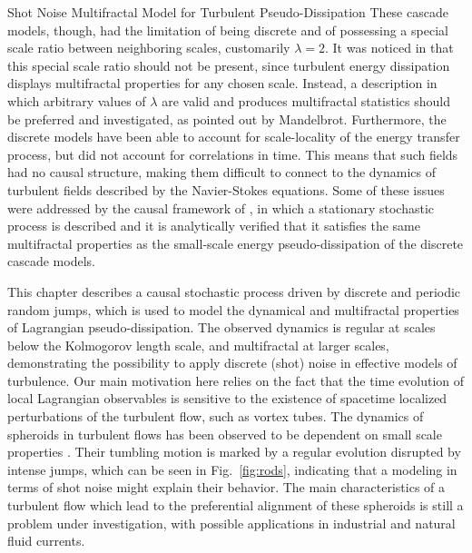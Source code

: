 \begin{chapter}{Shot Noise Multifractal Model for Turbulent Pseudo-Dissipation}
These cascade models, though, had the limitation of being discrete and of possessing a special scale ratio between neighboring scales, customarily $\lambda=2$. It was noticed in \textcite{mandelbrot1972} that this special scale ratio should not be present, since turbulent energy dissipation displays multifractal properties for any chosen scale. Instead, a description in which arbitrary values of $\lambda$ are valid and produces multifractal statistics should be preferred and investigated, as pointed out by Mandelbrot.
Furthermore, the discrete models have been able to account for scale-locality of the energy transfer process, but did not account for correlations in time. This means that such fields had no causal structure, making them difficult to connect to the dynamics of turbulent fields described by the Navier-Stokes equations. Some of these issues were addressed by the causal framework of \textcite{pereira2018multifractal}, in which a stationary stochastic process is described and it is analytically verified that it satisfies the same multifractal properties as the small-scale energy pseudo-dissipation of the discrete cascade models.

This chapter describes a causal stochastic process driven by discrete and periodic random jumps, which is used to model the dynamical and multifractal properties of Lagrangian pseudo-dissipation. The observed dynamics is regular at scales below the Kolmogorov length scale, and multifractal at larger scales, demonstrating the possibility to apply discrete (shot) noise in effective models of turbulence.
Our main motivation here relies on the fact that the time evolution of local Lagrangian observables is sensitive to the existence of spacetime localized perturbations of the turbulent flow, such as vortex tubes. The dynamics of spheroids in turbulent flows has been observed to be dependent on small scale properties \parencite{parsa2012,voth2017}. Their tumbling motion is marked by a regular evolution disrupted by intense jumps, which can be seen in Fig.~\ref{fig:rods}, indicating that a modeling in terms of shot noise might explain their behavior. The main characteristics of a turbulent flow which lead to the preferential alignment of these spheroids is still a problem under investigation, with possible applications in industrial and natural fluid currents.


\end{chapter}
